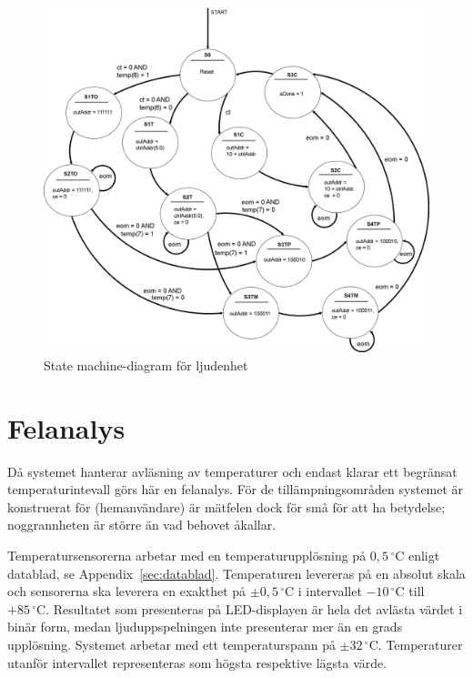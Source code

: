 \documentclass[a4paper,11pt]{article}
\begin{document}
	\begin{figure}[H]
	  \centering
	      \includegraphics[scale=0.18, angle=0]{SoundStateMachineDiagram.png}
	  	\caption{State machine-diagram för ljudenhet}
		\label{fig:SoundSM}
	\end{figure}

\pagebreak

\section{Felanalys}

Då systemet hanterar avläsning av temperaturer och endast klarar ett begränsat temperaturintevall
görs här en felanalys. För de tillämpningsområden systemet är konstruerat för (hemanvändare) 
är mätfelen dock för små för att ha betydelse; noggrannheten är större än vad behovet åkallar.

Temperatursensorerna arbetar med en temperaturupplösning på $0,5\,^{\circ}\mathrm{C}$ enligt datablad, se Appendix~\ref{sec:datablad}. Temperaturen levereras på en absolut skala och sensorerna ska leverera en exakthet på $\pm 0,5\,^{\circ}\mathrm{C}$ i intervallet $-10\,^{\circ}\mathrm{C}$ till $+85\,^{\circ}\mathrm{C}$. Resultatet som presenteras på LED-displayen är hela det avlästa värdet i binär form, medan ljuduppspelningen inte presenterar mer än en grads upplösning.
Systemet arbetar med ett temperaturspann på $\pm 32\,^{\circ}\mathrm{C}$. Temperaturer utanför intervallet representeras som högsta respektive lägsta värde.
\end{document}
